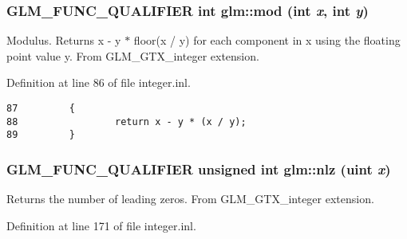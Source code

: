 \hypertarget{group__gtx__integer_gb9d22df91aac4d9eb925a4910f556f1b}{
\subsubsection[mod]{\setlength{\rightskip}{0pt plus 5cm}GLM\_\-FUNC\_\-QUALIFIER int glm::mod (int {\em x}, \/  int {\em y})}}
\label{group__gtx__integer_gb9d22df91aac4d9eb925a4910f556f1b}


Modulus. Returns x - y $\ast$ floor(x / y) for each component in x using the floating point value y. From GLM\_\-GTX\_\-integer extension. 

Definition at line 86 of file integer.inl.

\begin{Code}\begin{verbatim}87         {
88                 return x - y * (x / y);
89         }
\end{verbatim}
\end{Code}


\hypertarget{group__gtx__integer_gcbe62fd2384464c16ea30ecc4defc11c}{
\subsubsection[nlz]{\setlength{\rightskip}{0pt plus 5cm}GLM\_\-FUNC\_\-QUALIFIER unsigned int glm::nlz (uint {\em x})}}
\label{group__gtx__integer_gcbe62fd2384464c16ea30ecc4defc11c}


Returns the number of leading zeros. From GLM\_\-GTX\_\-integer extension. 

Definition at line 171 of file integer.inl.

